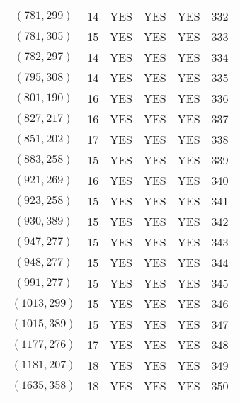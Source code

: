 \begin{longtable}{|c|c|c|c|c|c|}
$(781, 299)$ & 14 & YES & YES & YES & 332\\
$(781, 305)$ & 15 & YES & YES & YES & 333\\
$(782, 297)$ & 14 & YES & YES & YES & 334\\
$(795, 308)$ & 14 & YES & YES & YES & 335\\
$(801, 190)$ & 16 & YES & YES & YES & 336\\
$(827, 217)$ & 16 & YES & YES & YES & 337\\
$(851, 202)$ & 17 & YES & YES & YES & 338\\
$(883, 258)$ & 15 & YES & YES & YES & 339\\
$(921, 269)$ & 16 & YES & YES & YES & 340\\
$(923, 258)$ & 15 & YES & YES & YES & 341\\
$(930, 389)$ & 15 & YES & YES & YES & 342\\
$(947, 277)$ & 15 & YES & YES & YES & 343\\
$(948, 277)$ & 15 & YES & YES & YES & 344\\
$(991, 277)$ & 15 & YES & YES & YES & 345\\
$(1013, 299)$ & 15 & YES & YES & YES & 346\\
$(1015, 389)$ & 15 & YES & YES & YES & 347\\
$(1177, 276)$ & 17 & YES & YES & YES & 348\\
$(1181, 207)$ & 18 & YES & YES & YES & 349\\
$(1635, 358)$ & 18 & YES & YES & YES & 350
\end{longtable}
